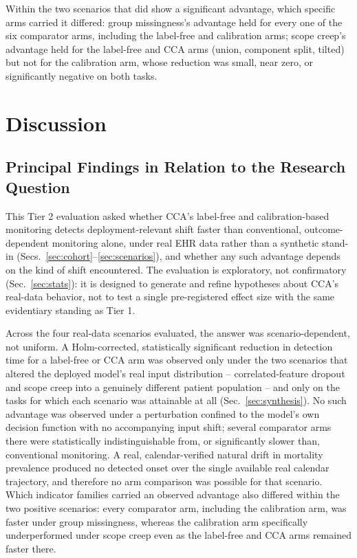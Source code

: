\documentclass[apajournal,article,submit,oneauthor]{Definitions/mdpi}
\begin{document}
Within the two scenarios that did show a significant advantage, which specific arms carried it differed: group missingness's advantage held for every one of the six comparator arms, including the label-free and calibration arms; scope creep's advantage held for the label-free and CCA arms (union, component split, tilted) but not for the calibration arm, whose reduction was small, near zero, or significantly negative on both tasks.

\section{Discussion}\label{sec:discussion}

\subsection{Principal Findings in Relation to the Research Question}\label{sec:disc-findings}

This Tier 2 evaluation asked whether CCA's label-free and calibration-based monitoring detects deployment-relevant shift faster than conventional, outcome-dependent monitoring alone, under real EHR data rather than a synthetic stand-in (Secs.~\ref{sec:cohort}--\ref{sec:scenarios}), and whether any such advantage depends on the kind of shift encountered. The evaluation is exploratory, not confirmatory (Sec.~\ref{sec:stats}): it is designed to generate and refine hypotheses about CCA's real-data behavior, not to test a single pre-registered effect size with the same evidentiary standing as Tier 1.

Across the four real-data scenarios evaluated, the answer was scenario-dependent, not uniform. A Holm-corrected, statistically significant reduction in detection time for a label-free or CCA arm was observed only under the two scenarios that altered the deployed model's real input distribution -- correlated-feature dropout and scope creep into a genuinely different patient population -- and only on the tasks for which each scenario was attainable at all (Sec.~\ref{sec:synthesis}). No such advantage was observed under a perturbation confined to the model's own decision function with no accompanying input shift; several comparator arms there were statistically indistinguishable from, or significantly slower than, conventional monitoring. A real, calendar-verified natural drift in mortality prevalence produced no detected onset over the single available real calendar trajectory, and therefore no arm comparison was possible for that scenario. Which indicator families carried an observed advantage also differed within the two positive scenarios: every comparator arm, including the calibration arm, was faster under group missingness, whereas the calibration arm specifically underperformed under scope creep even as the label-free and CCA arms remained faster there.
\end{document}
